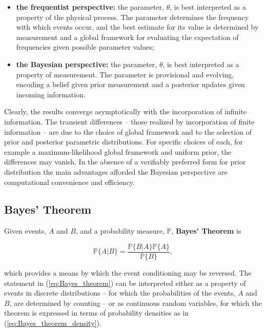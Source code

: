 \documentclass[12pt, twoside, draft]{article}
\begin{document}
\begin{itemize}[noitemsep]
\item \textbf{the frequentist perspective:} the parameter, $\theta$, is best interpreted as a property of the physical process.  The parameter determines the frequency with which events occur, and the best estimate for its value is determined by measurement and a global framework for evaluating the expectation of frequencies given possible parameter values;
\item \textbf{the Bayesian perspective:} the parameter, $\theta$, is best interpreted as a property of measurement.  The parameter is provisional and evolving, encoding a belief given prior measurement and a posterior updates given incoming information.
\end{itemize} 

Clearly, the results converge asymptotically with the incorporation of infinite information.  The transient differences -- those realized by incorporation of finite information -- are due to the choice of global framework and to the selection of prior and posterior parametric distributions.  For specific choices of each, for example a maximum-likelihood global framework and uniform prior, the differences may vanish.  In the absence of a verifiably preferred form for prior distribution the main advantages afforded the Bayesian perspective are computational convenience and efficiency.

\subsection{Bayes' Theorem}\label{sec:Bayes_theorem}
Given events, $A$ and $B$, and a probability measure, $\mathbb{P}$, \textbf{Bayes' Theorem} is

\begin{equation}\label{eq:Bayes_theorem}
\mathbb{P}\{ A | B \} = \frac{\mathbb{P}\{ B | A \} \mathbb{P} \{ A \}}{\mathbb{P}\{ B \}},
\end{equation}

which provides a means by which the event conditioning may be reversed.  The statement in (\ref{eq:Bayes_theorem}) can be interpreted either as a property of events in discrete distributions -- for which the probabilities of the events, $A$ and $B$, are determined by counting -- or as continuous random variables, for which the theorem is expressed in terms of probability densities as in (\ref{eq:Bayes_theorem_density}).
\end{document}
